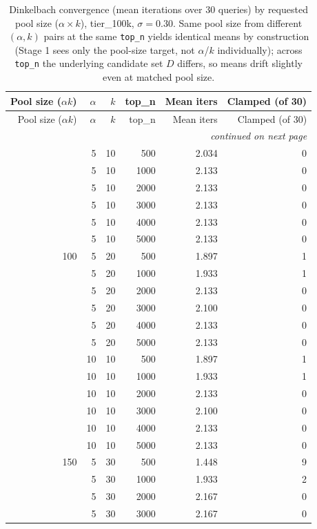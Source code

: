 \begin{longtable}{rrrrrr}
\caption{Dinkelbach convergence (mean iterations over 30 queries) by requested pool size ($\alpha \times k$), tier\_100k, $\sigma=0.30$. Same pool size from different $(\alpha,k)$ pairs at the same \texttt{top\_n} yields identical means by construction (Stage 1 sees only the pool-size target, not $\alpha$/$k$ individually); across \texttt{top\_n} the underlying candidate set $D$ differs, so means drift slightly even at matched pool size.}
\label{tab:dinkelbach-convergence-tier100k}\\
\toprule
Pool size ($\alpha k$) & $\alpha$ & $k$ & top\_n & Mean iters & Clamped (of 30) \\
\midrule
\endfirsthead
\toprule
Pool size ($\alpha k$) & $\alpha$ & $k$ & top\_n & Mean iters & Clamped (of 30) \\
\midrule
\endhead
\midrule \multicolumn{6}{r}{\textit{continued on next page}} \\ \midrule
\endfoot
\bottomrule
\endlastfoot
50 & 5 & 10 & 500 & 2.034 & 0 \\
 & 5 & 10 & 1000 & 2.133 & 0 \\
 & 5 & 10 & 2000 & 2.133 & 0 \\
 & 5 & 10 & 3000 & 2.133 & 0 \\
 & 5 & 10 & 4000 & 2.133 & 0 \\
 & 5 & 10 & 5000 & 2.133 & 0 \\
\midrule
100 & 5 & 20 & 500 & 1.897 & 1 \\
 & 5 & 20 & 1000 & 1.933 & 1 \\
 & 5 & 20 & 2000 & 2.133 & 0 \\
 & 5 & 20 & 3000 & 2.100 & 0 \\
 & 5 & 20 & 4000 & 2.133 & 0 \\
 & 5 & 20 & 5000 & 2.133 & 0 \\
 & 10 & 10 & 500 & 1.897 & 1 \\
 & 10 & 10 & 1000 & 1.933 & 1 \\
 & 10 & 10 & 2000 & 2.133 & 0 \\
 & 10 & 10 & 3000 & 2.100 & 0 \\
 & 10 & 10 & 4000 & 2.133 & 0 \\
 & 10 & 10 & 5000 & 2.133 & 0 \\
\midrule
150 & 5 & 30 & 500 & 1.448 & 9 \\
 & 5 & 30 & 1000 & 1.933 & 2 \\
 & 5 & 30 & 2000 & 2.167 & 0 \\
 & 5 & 30 & 3000 & 2.167 & 0 \\

\end{longtable}
